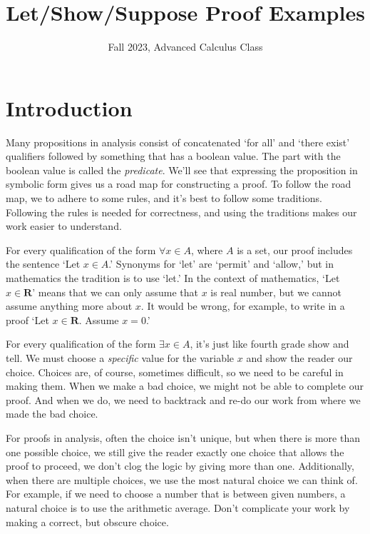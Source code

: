 \documentclass[12pt,fleqn,answers]{article}
\title{Let/Show/Suppose Proof Examples}
\author{Fall 2023, Advanced Calculus Class}
\newcommand{\reals}{\mathbf{R}}
\begin{document}
\maketitle

\section{Introduction}

Many propositions in analysis consist of concatenated `for all' and `there exist'  qualifiers followed by something that has a boolean value.  
The part with the boolean value is called the \emph{predicate}. We'll see that expressing the proposition in symbolic 
form gives us a road map for constructing  a proof. To follow the road map, we to 
adhere to some rules, and it's best to follow some traditions.  Following the rules is 
needed for correctness,  and using the  traditions makes 
 our work easier to understand.

For every qualification of the form $\forall x \in A$, where $A$ is a set, our proof includes the sentence `Let $x \in A$.'  Synonyms  for  `let' 
are `permit' and `allow,' but in mathematics the tradition is to use `let.' In the context of mathematics, `Let $x \in \reals$' means that we can only assume that $x$ is real number, but we cannot assume anything more about $x$. It would be wrong, for example, to write in a proof  
`Let $x \in \reals$. Assume $x = 0$.'

For every qualification of the form $\exists x \in A$, it's just like fourth grade show and tell. We must choose a \emph{specific} value for the 
variable $x$ and show the reader our choice. Choices are, of course, sometimes difficult, so we need to be careful in making them. When we make a bad choice, we might not be able to complete our proof. And when we  do, we need to backtrack and re-do our work from where
we made the bad choice.

For proofs in analysis, often the choice isn't unique, but when there is more than one possible choice,
we still give the reader exactly one choice that allows the proof to proceed, we don't clog the logic by giving more than one.
Additionally, when there are multiple choices, we use the most natural choice we can think of. For example, if we need to choose a number that is between
given numbers, a natural choice is to use the arithmetic average. Don't complicate your work by making a correct, but obscure choice.
\end{document}
